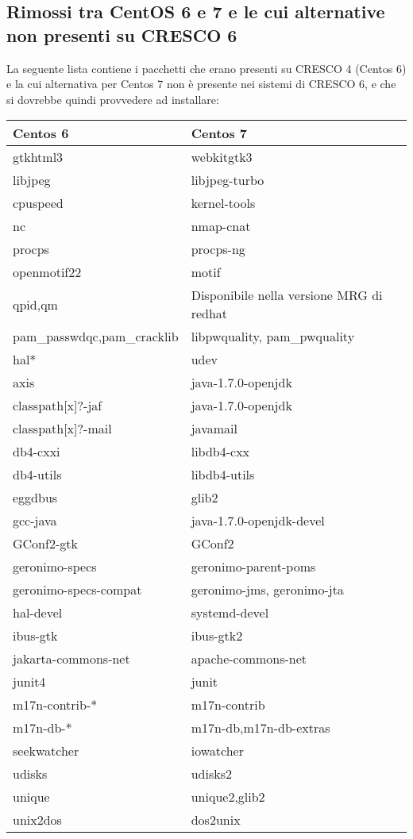 \documentclass[11pt]{article}
\begin{document}
{\subsection{Rimossi tra CentOS 6 e 7 e le cui alternative non presenti su CRESCO 6}
La seguente lista contiene i pacchetti che erano presenti su CRESCO 4 (Centos 6) e la cui alternativa per Centos 7 non è presente
nei sistemi di CRESCO 6, e che si dovrebbe quindi provvedere ad installare:
\begin{center}
	\renewcommand{\arraystretch}{1.5}
	\begin{tabular}{|l|l|}
		\hline
		\rowcolor{hgray}
		\textbf{Centos 6} & \textbf{Centos 7} \\
		\hline
		gtkhtml3 & webkitgtk3 \\ \hline
		libjpeg & libjpeg-turbo \\ \hline
		cpuspeed & kernel-tools \\ \hline
		nc & nmap-cnat \\ \hline
		procps & procps-ng \\ \hline
		openmotif22 & motif \\ \hline
		qpid,qm & Disponibile nella versione MRG di redhat \\ \hline
		pam\_passwdqc,pam\_cracklib & libpwquality, pam\_pwquality \\ \hline
		hal* & udev \\ \hline
		axis & java-1.7.0-openjdk \\ \hline
		classpath[x]?-jaf & java-1.7.0-openjdk \\ \hline
		classpath[x]?-mail & javamail \\ \hline
		db4-cxxi & libdb4-cxx \\ \hline
		db4-utils & libdb4-utils \\ \hline
		eggdbus & glib2 \\ \hline
		gcc-java & java-1.7.0-openjdk-devel \\ \hline
		GConf2-gtk & GConf2 \\ \hline
		geronimo-specs & geronimo-parent-poms \\ \hline
		geronimo-specs-compat & geronimo-jms, geronimo-jta \\ \hline
		hal-devel & systemd-devel \\ \hline
		ibus-gtk & ibus-gtk2 \\ \hline
		jakarta-commons-net & apache-commons-net \\ \hline
		junit4 & junit \\ \hline
		m17n-contrib-* & m17n-contrib \\ \hline
		m17n-db-* & m17n-db,m17n-db-extras \\ \hline
		seekwatcher & iowatcher \\ \hline
		udisks & udisks2 \\ \hline
		unique & unique2,glib2 \\ \hline
		unix2dos & dos2unix \\ \hline
	\end{tabular}
\end{center}

}
\end{document}
